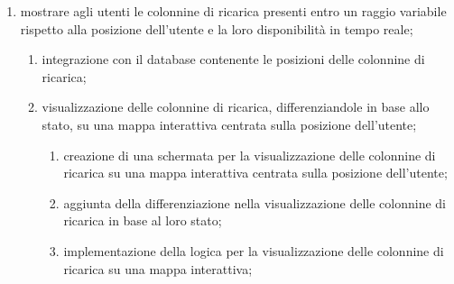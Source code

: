 \documentclass[a4paper,12pt]{article}
\begin{document}
\begin{enumerate}
\begin{enumerate}
\begin{enumerate}
            \item implementazione della logica per la registrazione di auto da parte degli utenti;
            \item implementazione della logica per la gestione delle auto registrate;
        \end{enumerate}
        \item memorizzazione delle impostazioni personalizzate;
        \begin{enumerate}
            \item memorizzazione e gestione del tema scelto dall'utente;
            \item memorizzazione e gestione personalizzata dell'organizzazione dei contenuti dell'home page;
        \end{enumerate}
        \item modifica dati dell'account;
        \begin{enumerate}
            \item creazione di una schermata per la visualizzazione e la modifica dei dati dell'account;
            \item implementazione della logica per la visualizzazione e la modifica dei dati dell'account;
        \end{enumerate}
    \end{enumerate}
    \item mostrare agli utenti le colonnine di ricarica presenti entro un raggio variabile rispetto alla posizione
    dell'utente e la loro disponibilità in tempo reale;
    \begin{enumerate}
        \item integrazione con il database contenente le posizioni delle colonnine di ricarica;
        \item visualizzazione delle colonnine di ricarica, differenziandole in base allo stato, su una mappa
        interattiva centrata sulla posizione dell'utente;
        \begin{enumerate}
            \item creazione di una schermata per la visualizzazione delle colonnine di ricarica su una mappa interattiva
            centrata sulla posizione dell'utente;
            \item aggiunta della differenziazione nella visualizzazione delle colonnine di ricarica in base al loro stato;
            \item implementazione della logica per la visualizzazione delle colonnine di ricarica su una mappa interattiva;

\end{enumerate}
\end{enumerate}
\end{enumerate}
\end{document}
